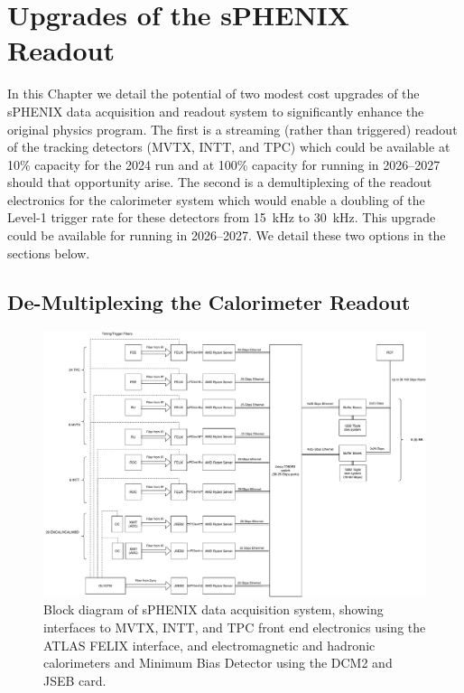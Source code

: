 \chapter{Upgrades of the sPHENIX Readout}
\label{chap:readout}

In this Chapter we detail the potential of two modest cost upgrades of
the sPHENIX data acquisition and readout system to significantly
enhance the original physics program.  The first is a streaming
(rather than triggered) readout of the tracking detectors (MVTX, INTT,
and TPC) which could be available at 10\% capacity for the 2024 run
and at 100\% capacity for running in 2026--2027 should that
opportunity arise.  The second is a demultiplexing of the readout
electronics for the calorimeter system which would enable a doubling
of the Level-1 trigger rate for these detectors from 15~kHz to 30~kHz.
This upgrade could be available for running in 2026--2027.  We detail
these two options in the sections below.



\section{De-Multiplexing the Calorimeter Readout}
\label{sec:streaming_readout}

\begin{figure}
    \centering
    \includegraphics[width=0.96\linewidth]{figs/sphenixdaq_servers_20200803.pdf}
    \caption{Block diagram of sPHENIX data acquisition system, showing
      interfaces to MVTX, INTT, and TPC front end electronics using
      the ATLAS FELIX interface, and electromagnetic and hadronic
      calorimeters and Minimum Bias Detector using the DCM2 and JSEB
      card.} 
    \label{fig:sphenixdaq_servers}
\end{figure}

